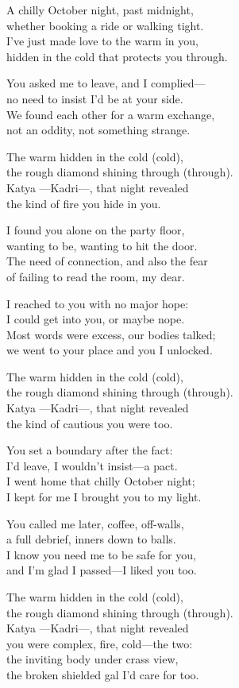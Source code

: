 \begin{lyrics}
A chilly October night, past midnight,\\
whether booking a ride or walking tight.\\
I’ve just made love to the warm in you,\\
hidden in the cold that protects you through.

You asked me to leave, and I complied—\\
no need to insist I’d be at your side.\\
We found each other for a warm exchange,\\
not an oddity, not something strange.

The warm hidden in the cold (cold),\\
the rough diamond shining through (through).\\
Katya —Kadri—, that night revealed\\
the kind of fire you hide in you.

I found you alone on the party floor,\\
wanting to be, wanting to hit the door.\\
The need of connection, and also the fear\\
of failing to read the room, my dear.

I reached to you with no major hope:\\
I could get into you, or maybe nope.\\
Most words were excess, our bodies talked;\\
we went to your place and you I unlocked.

The warm hidden in the cold (cold),\\
the rough diamond shining through (through).\\
Katya —Kadri—, that night revealed\\
the kind of cautious you were too.

You set a boundary after the fact:\\
I’d leave, I wouldn’t insist—a pact.\\
I went home that chilly October night;\\
I kept for me I brought you to my light.

You called me later, coffee, off-walls,\\
a full debrief, inners down to balls.\\
I know you need me to be safe for you,\\
and I’m glad I passed—I liked you too.

The warm hidden in the cold (cold),\\
the rough diamond shining through (through).\\
Katya —Kadri—, that night revealed\\
you were complex, fire, cold—the two:\\
the inviting body under crass view,\\
the broken shielded gal I’d care for too.
\end{lyrics}

